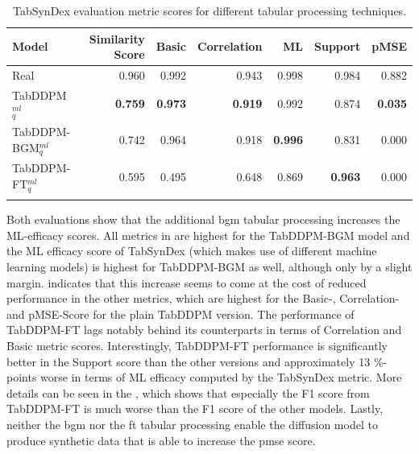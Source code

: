 \begin{table}[h]
	\centering
	\begin{tabular}{lrrrrrr}
		\toprule
		\textbf{Model}         & \textbf{Similarity Score} & \textbf{Basic} & \textbf{Correlation} & \textbf{ML}    & \textbf{Support} & \textbf{pMSE}  \\
		\midrule
		Real                   & 0.960                     & 0.992          & 0.943                & 0.998          & 0.984            & 0.882          \\
		TabDDPM$^{ml}_{q}$     & \textbf{0.759}            & \textbf{0.973} & \textbf{0.919}       & 0.992          & 0.874            & \textbf{0.035} \\
		TabDDPM-BGM$^{ml}_{q}$ & 0.742                     & 0.964          & 0.918                & \textbf{0.996} & 0.831            & 0.000          \\
		TabDDPM-FT$^{ml}_{q}$  & 0.595                     & 0.495          & 0.648                & 0.869          & \textbf{0.963}   & 0.000          \\
		\bottomrule
		\multicolumn{7}{c}{}\\[-0.6em]
	\end{tabular}
	\caption[Experiment 1 TabSynDex]{TabSynDex evaluation metric scores for different tabular processing techniques.}
	\label{tab:exp1-sim}
\end{table}

Both evaluations show that the additional \gls{bgm} tabular processing increases the ML-efficacy scores.
All metrics in  are highest for the TabDDPM-BGM model and the ML efficacy score of TabSynDex (which makes use of different machine learning models)
is highest for TabDDPM-BGM as well, although only by a slight margin.
 indicates that this increase seems to come at the cost of reduced performance in the other metrics, which are highest for the Basic-, Correlation- and pMSE-Score for the plain TabDDPM version.
The performance of TabDDPM-FT lags notably behind its counterparts in terms of Correlation and Basic metric scores.
Interestingly, TabDDPM-FT performance is significantly better in the Support score than the other versions and approximately 13 \%-points worse in terms of ML efficacy computed by the TabSynDex metric.
More details can be seen in the , which shows that especially the F1 score from TabDDPM-FT is much worse than the F1 score of the other models.
Lastly, neither the \gls{bgm} nor the \gls{ft} tabular processing enable the diffusion model to produce synthetic data that is able to increase the \gls{pmse} score.


